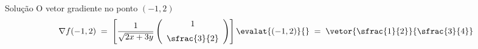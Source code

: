 \begin{resolution}{Solução}
  O vetor gradiente no ponto \((-1, 2)\)
  \[
    \nabla f(-1, 2)
    \;=\; \left[\frac{1}{\sqrt{2x+3y}} \left(\begin{array}{c}
      1 \\[2mm]
      \sfrac{3}{2}
    \end{array}\right)\right]\evalat{(-1, 2)}{}
    \;=\; \vetor{\sfrac{1}{2}}{\sfrac{3}{4}}
  \]
\end{resolution}

